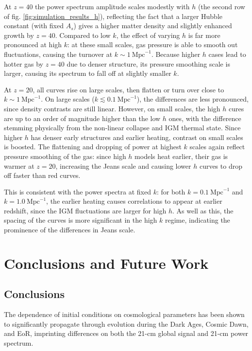 \documentclass[floats,floatfix,showpacs,amssymb,prd,superscriptaddress,nofootinbib]{revtex4-2} %
\begin{document}
At $z = 40$ the power spectrum amplitude scales modestly with $h$ (the second row of fig. \ref{fig:simulation_results_h}), reflecting the fact that a larger Hubble constant (with fixed $A_s$) gives a higher matter density and slightly enhanced growth by $z = 40$. Compared to low $k$, the effect of varying $h$ is far more pronounced at high $k$: at these small scales, gas pressure is able to smooth out fluctuations, causing the turnover at $k \sim 1 ~\text{Mpc}^{-1}$. Because higher $h$ cases lead to hotter gas by $z = 40$ due to denser structure, its pressure smoothing scale is larger, causing its spectrum to fall off at slightly smaller $k$. 

At $z = 20$, all curves rise on large scales, then flatten or turn over close to $k \sim 1 ~\text{Mpc}^{-1}$. On large scales ($k \lesssim 0.1 ~\text{Mpc}^{-1}$), the differences are less pronounced, since density contrasts are still linear. However, on small scales, the high $h$ cures are up to an order of magnitude higher than the low $h$ ones, with the difference stemming physically from the non-linear collapse and IGM thermal state. Since higher $h$ has denser early structures and earlier heating, contrast on small scales is boosted. The flattening and dropping of power at highest $k$ scales again reflect pressure smoothing of the gas: since high $h$ models heat earlier, their gas is warmer at $z = 20$, increasing the Jeans scale and causing lower $h$ curves to drop off faster than red curves.

This is consistent with the power spectra at fixed $k$: for both $k = 0.1 ~\text{Mpc}^{-1}$ and $k = 1.0 ~\text{Mpc}^{-1}$, the earlier heating causes correlations to appear at earlier redshift, since the IGM fluctuations are larger for high $h$. As well as this, the spacing of the curves is more significant in the high $k$ regime, indicating the prominence of the differences in Jeans scale.

\section{Conclusions and Future Work}
\subsection{Conclusions}
The dependence of initial conditions on cosmological parameters has been shown to significantly propagate through evolution during the Dark Ages, Cosmic Dawn, and EoR, imprinting differences on both the 21-cm global signal and 21-cm power spectrum. 
\end{document}
